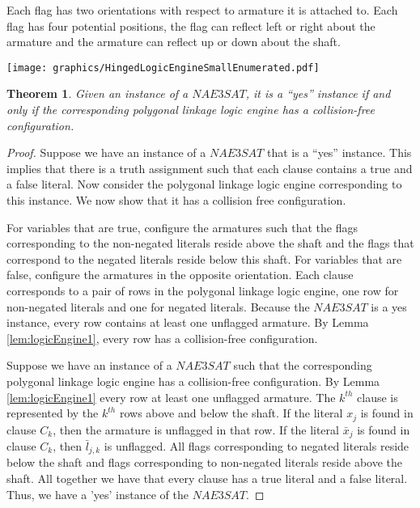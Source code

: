 \documentclass[10pt]{CSUNthesis}
\theoremstyle{plain}%
\newtheorem{thm}{Theorem}
\theoremstyle{definition}
\theoremstyle{remark}
\begin{document}
Each flag has two orientations with respect to armature it is attached to.  Each flag has four potential positions, the flag can reflect left or right about the armature and the armature can reflect up or down about the shaft.

\begin{minipage}{\linewidth}
\begin{center}
\texttt{[image: graphics/HingedLogicEngineSmallEnumerated.pdf]}
\label{fig:HingedLogicEngineSmallEnumerated.pdf}
\end{center}
\end{minipage}

\begin{thm}\label{thm:chp2-HingedPolygons-1}
 Given an instance of a $NAE3SAT$,  it is a ``yes'' instance if and only if the 
corresponding polygonal linkage logic engine has a collision-free configuration.  
\end{thm}
\begin{proof}
Suppose we have an instance of a $NAE3SAT$ that is a ``yes'' instance. This implies that there is a 
truth assignment such that each clause contains a true and a false literal. Now consider the polygonal linkage logic 
engine corresponding to this instance. We now 
show that it has a collision free configuration.

For variables that are true, configure the armatures such that the flags corresponding to the 
non-negated literals reside above the 
shaft and the flags that correspond to the negated literals reside below this shaft.  For variables 
that are false, configure the 
armatures in the opposite orientation.  Each clause corresponds to a pair of rows in 
the polygonal linkage logic engine, one row for non-negated literals and one for negated literals.  Because the 
$NAE3SAT$ is a yes instance, every row contains at least one unflagged armature.  
By Lemma \ref{lem:logicEngine1}, every row  has a collision-free configuration.

Suppose we have an instance of a $NAE3SAT$ such that the corresponding polygonal linkage logic engine has a 
collision-free configuration. By Lemma \ref{lem:logicEngine1} every row at least one unflagged 
armature.  The $k^{th}$ clause is represented by the $k^{th}$ rows above and below the shaft. If the 
literal $x_j$ is found in clause $C_k$, then the armature is unflagged in that row. If the literal 
$\bar{x}_j$ is found in clause $C_k$, then $\bar{l}_{j,k}$ is unflagged.  All flags 
corresponding to negated literals reside below the shaft and flags corresponding to non-negated 
literals reside above the shaft.  All together we have that every clause has a true literal and a 
false literal.  Thus, we have a 'yes' instance of the $NAE3SAT$.
\end{proof}
\end{document}
